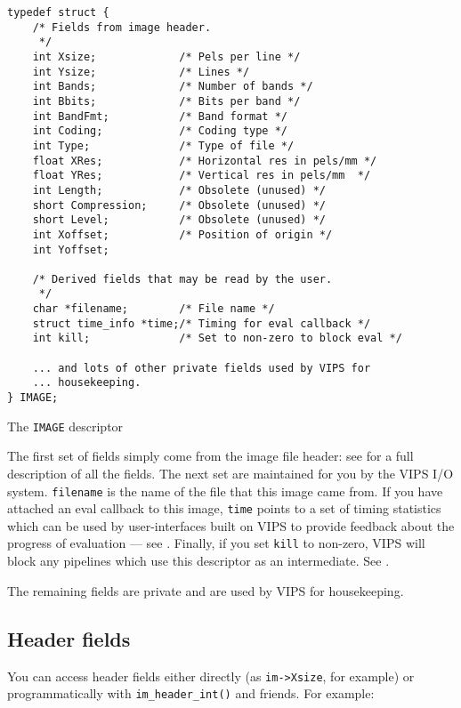 \begin{fig2}
\begin{verbatim}
typedef struct {
    /* Fields from image header.
     */
    int Xsize;             /* Pels per line */
    int Ysize;             /* Lines */
    int Bands;             /* Number of bands */
    int Bbits;             /* Bits per band */
    int BandFmt;           /* Band format */
    int Coding;            /* Coding type */
    int Type;              /* Type of file */
    float XRes;            /* Horizontal res in pels/mm */
    float YRes;            /* Vertical res in pels/mm  */
    int Length;            /* Obsolete (unused) */
    short Compression;     /* Obsolete (unused) */
    short Level;           /* Obsolete (unused) */
    int Xoffset;           /* Position of origin */    
    int Yoffset;
   
    /* Derived fields that may be read by the user. 
     */
    char *filename;        /* File name */
    struct time_info *time;/* Timing for eval callback */
    int kill;              /* Set to non-zero to block eval */

    ... and lots of other private fields used by VIPS for 
    ... housekeeping.
} IMAGE;
\end{verbatim}
\caption{The \texttt{IMAGE} descriptor}
\label{fg:image}
\end{fig2}

The first set of fields simply come from the image file header:
see  for a full description of all the fields. The next
set are maintained for you by the VIPS I/O system. \verb+filename+ is the
name of the file that this image came from.  If you have attached an eval
callback to this image, \verb+time+ points to a set of timing statistics
which can be used by user-interfaces built on VIPS to provide feedback
about the progress of evaluation --- see . Finally, if you
set \verb+kill+ to non-zero, VIPS will block any pipelines which use this
descriptor as an intermediate. See .

The remaining fields are private and are used by VIPS for housekeeping.

\subsection{Header fields}
\label{sec:fields}

You can access header fields either directly (as \verb+im->Xsize+, for
example) or programmatically with \verb+im_header_int()+ and friends. For
example:

